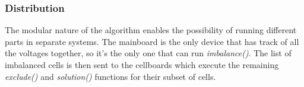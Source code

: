 \subsubsection{Distribution}
The modular nature of the algorithm enables the possibility of running different parts in separate systems. The mainboard is the only device that has track of all the voltages together, so it's the only one that can run \textit{imbalance()}. The list of imbalanced cells is then sent to the cellboards which execute the remaining \textit{exclude()} and \textit{solution()} functions for their subset of cells.

\newpage

